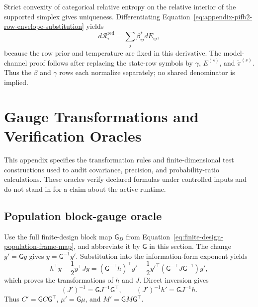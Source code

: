 Strict convexity of categorical relative entropy on the relative interior of the supported simplex gives uniqueness. Differentiating Equation~\eqref{eq:appendix-pifb2-row-envelope-substitution} yields
\begin{equation}
d\mathcal R_i^{\mathrm{red}}
=\sum_j\beta_{ij}^*dE_{ij},
\label{eq:appendix-pifb2-row-envelope-differential}
\end{equation}
because the row prior and temperature are fixed in this derivative. The model-channel proof follows after replacing the state-row symbols by \(\gamma\), \(E^{(s)}\), and \(\widetilde\pi^{(s)}\). Thus the \(\beta\) and \(\gamma\) rows each normalize separately; no shared denominator is implied.

\chapter{Gauge Transformations and Verification Oracles}

This appendix specifies the transformation rules and finite-dimensional test constructions used to audit covariance, precision, and probability-ratio calculations. These oracles verify declared formulas under controlled inputs and do not stand in for a claim about the active runtime.

\section{Population block-gauge oracle}
\label{sec:population-block-gauge-oracle}

Use the full finite-design block map \(\mathsf G_D\) from Equation~\eqref{eq:finite-design-population-frame-map}, and abbreviate it by \(\mathsf G\) in this section. The change \(y'=\mathsf Gy\) gives \(y=\mathsf G^{-1}y'\). Substitution into the information-form exponent yields
\begin{equation}
h^\top y-\frac12y^\top Jy
=\left(\mathsf G^{-\top}h\right)^\top y'
-\frac12y'^\top
\left(\mathsf G^{-\top}J\mathsf G^{-1}\right)y',
\label{eq:appendix-information-exponent-gauge-law}
\end{equation}
which proves the transformations of \(h\) and \(J\). Direct inversion gives
\begin{equation}
(J')^{-1}=\mathsf GJ^{-1}\mathsf G^\top,
\qquad
(J')^{-1}h'=\mathsf GJ^{-1}h.
\label{eq:appendix-information-moment-gauge-compatibility}
\end{equation}
Thus \(C'=\mathsf GC\mathsf G^\top\), \(\mu'=\mathsf G\mu\), and \(M'=\mathsf GM\mathsf G^\top\).

